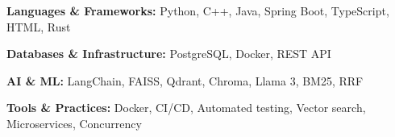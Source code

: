 
\noindent\textbf{Languages \& Frameworks:} Python, C++, Java, Spring Boot, TypeScript, HTML, Rust\par
\noindent\textbf{Databases \& Infrastructure:} PostgreSQL, Docker, REST API\par
\noindent\textbf{AI \& ML:} LangChain, FAISS, Qdrant, Chroma, Llama 3, BM25, RRF\par
\noindent\textbf{Tools \& Practices:} Docker, CI/CD, Automated testing, Vector search, Microservices, Concurrency\par
